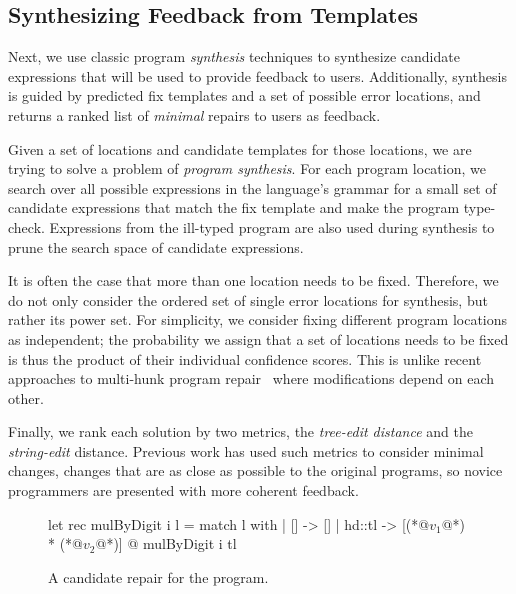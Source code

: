 \subsection{Synthesizing Feedback from Templates}
\label{sec:overview:synthesis}

Next, we use classic program \emph{synthesis} techniques to synthesize candidate
expressions that will be used to provide feedback to users. Additionally,
synthesis is guided by predicted fix templates and a set of possible error
locations, and returns a ranked list of \emph{minimal} repairs to users as
feedback.

 Given a set of locations and candidate templates for
those locations, we are trying to solve a problem of \emph{program synthesis}.
For each program location, we search over all possible
expressions in the language's grammar for a small set of candidate
expressions that match the fix template and make the program type-check.
Expressions from the ill-typed program are also used during synthesis
to prune the search space of candidate expressions.

It is often the case that more than one location needs to be fixed. Therefore,
we do not only consider the ordered set of single error locations for synthesis,
but rather its power set. For simplicity, we consider fixing different program
locations as independent; the probability we assign that a set of locations
needs to be fixed is thus the product of their individual confidence scores.
This is unlike recent approaches to multi-hunk program repair~\citep{Saha_2019}
where modifications depend on each other.

 Finally, we rank each solution by two metrics, the
\emph{tree-edit distance} and the \emph{string-edit} distance. Previous work
\citep{Lerner2007-dt, Wang_2018, Gulwani_2018} has used such metrics to consider
minimal changes, \ie changes that are as close as possible to the original
programs, so novice programmers are presented with more coherent feedback.

\begin{figure}[ht]
  \begin{ecode}
  let rec mulByDigit i l =
    match l with
    | []     -> []
    | hd::tl -> [(*@$v_1$@*) * (*@$v_2$@*)] @ mulByDigit i tl
  \end{ecode}
  \caption{A candidate repair for the \mbd program.}
  \label{fig:repair}
  \end{figure}

